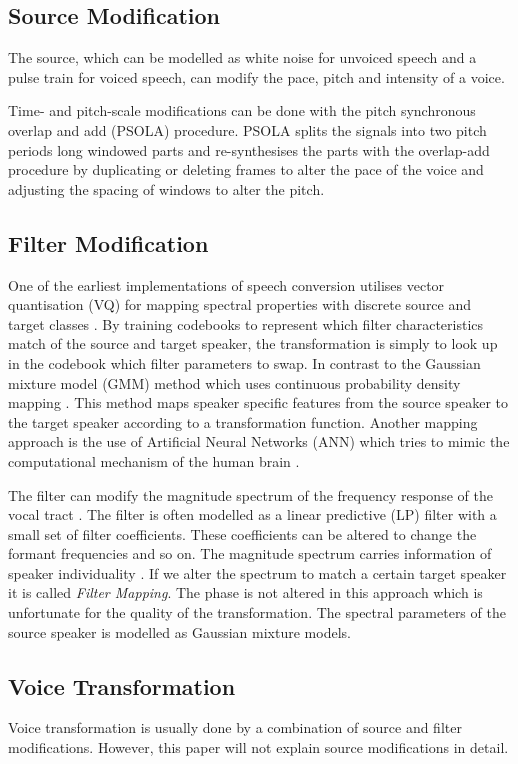 \subsection{Source Modification} %
\label{sub:source_modification}
The source, which can be modelled as white noise for unvoiced speech and a pulse train for voiced speech, can modify the pace, pitch and intensity of a voice. 

Time- and pitch-scale modifications can be done with the pitch synchronous overlap and add (PSOLA) procedure. PSOLA splits the signals into two pitch periods long windowed parts and re-synthesises the parts with the overlap-add procedure by duplicating or deleting frames to alter the pace of the voice and adjusting the spacing of windows to alter the pitch.

\subsection{Filter Modification} %
\label{sub:filter_modification}
One of the earliest implementations of speech conversion utilises vector quantisation (VQ) for mapping spectral properties with discrete source and target classes \cite{abe88}. By training codebooks to represent which filter characteristics match of the source and target speaker, the transformation is simply to look up in the codebook which filter parameters to swap. In contrast to the Gaussian mixture model (GMM) method which uses continuous probability density mapping \cite{stylianou98}. This method maps speaker specific features from the source speaker to the target speaker according to a transformation function. Another mapping approach is the use of Artificial Neural Networks (ANN) \cite{desai09} which tries to mimic the computational mechanism of the human brain \cite{young75}.

The filter can modify the magnitude spectrum of the frequency response of the vocal tract \cite{nguyen09}. The filter is often modelled as a linear predictive (LP) filter with a small set of filter coefficients. These coefficients can be altered to change the formant frequencies and so on. The magnitude spectrum carries information of speaker individuality \cite{stylianou09}. If we alter the spectrum to match a certain target speaker it is called \emph{Filter Mapping}. The phase is not altered in this approach which is unfortunate for the quality of the transformation. The spectral parameters of the source speaker is modelled as Gaussian mixture models.

\subsection{Voice Transformation} %
\label{sub:voice_transformation}
Voice transformation is usually done by a combination of source and filter modifications. However, this paper will not explain source modifications in detail.

